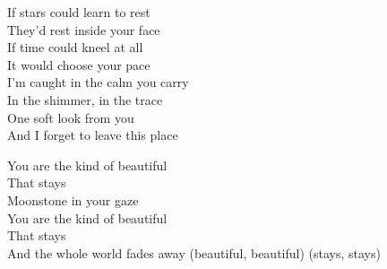 \begin{lyrics}
If stars could learn to rest\\
They’d rest inside your face\\
If time could kneel at all\\
It would choose your pace\\
I’m caught in the calm you carry\\
In the shimmer, in the trace\\
One soft look from you\\
And I forget to leave this place

You are the kind of beautiful\\
That stays\\
Moonstone in your gaze\\
You are the kind of beautiful\\
That stays\\
And the whole world fades away
(beautiful, beautiful)
(stays, stays)
\end{lyrics}

